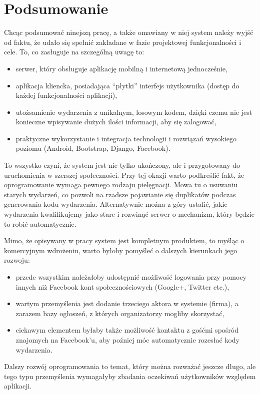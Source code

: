 \documentclass[12pt,titlepage]{article}
\begin{document}
\newpage
\section*{Podsumowanie}
Chcąc podsumować ninejszą pracę, a także omawiany w niej system należy wyjść od faktu, że udało się spełnić zakładane w fazie projektowej funkcjonalności i cele.
To, co zasługuje na szczególną uwagę to:
\begin{itemize}
 \item serwer, który obsługuje aplikację mobilną i internetową jednocześnie,
 \item aplikacja kliencka, posiadająca ``płytki'' interfejs użytkownika (dostęp do każdej funkcjonalności aplikacji),
 \item utożsamienie wydarzenia z unikalnym, losowym kodem, dzięki czemu nie jest konieczne wpisywanie dużych ilości informacji, aby się zalogować,
 \item praktyczne wykorzystanie i integracja technologii i rozwiązań wysokiego poziomu (Android, Bootstrap, Django, Facebook).
\end{itemize}
To wszystko czyni, że system jest nie tylko ukończony, ale i przygotowany do uruchomienia w szerszej społeczności. Przy tej okazji warto podkreślić fakt, że oprogramowanie
wymaga pewnego rodzaju pielęgnacji. Mowa tu o usuwaniu starych wydarzeń, co pozwoli na rzadsze pojawianie się duplikatów podczas generowania kodu wydarzenia.
Alternatywnie można z góry ustalić, jakie wydarzenia kwalifikujemy jako stare i rozwinąć serwer o mechanizm, który będzie to robić automatycznie.

Mimo, że opisywany w pracy system jest kompletnym produktem, to myśląc o komercyjnym wdrożeniu, warto byłoby pomyśleć o dalszych kierunkach jego rozwoju:
\begin{itemize}
 \item przede wszystkim należałoby udostępnić możliwość logowania przy pomocy innych niż Facebook kont społecznościowych (Google+, Twitter etc.),
 \item wartym przemyślenia jest dodanie trzeciego aktora w systemie (firma), a zarazem bazy ogłoszeń, z których organizatorzy mogliby skorzystać,
 \item ciekawym elementem byłaby także możliwość kontaktu z gośćmi spośród znajomych na Facebook'u, aby poźniej móc automatycznie rozesłać kody wydarzenia.
\end{itemize}
Dalszy rozwój oprogramowania to temat, który można rozważać jeszcze długo, ale tego typu przemyślenia wymagałyby zbadania oczekiwań użytkowników względem aplikacji.
\end{document}
